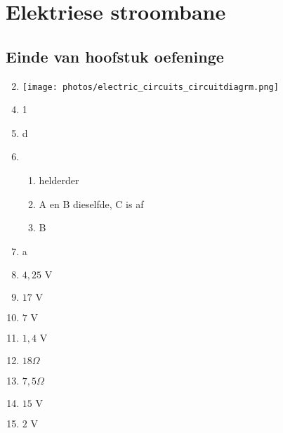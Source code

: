 \section{Elektriese stroombane}

\subsection{Einde van hoofstuk oefeninge}
\begin{enumerate}[noitemsep, label=\textbf{(\arabic*)} ]
\setcounter{enumi}{1}
 \item \texttt{[image: photos/electric\_circuits\_circuitdiagrm.png]}
\end{enumerate}
\begin{multicols}{3}
 \begin{enumerate}[noitemsep, label=\textbf{(\arabic*)} ]
\setcounter{enumi}{3}
\item 1
\item d
\item 
 \begin{enumerate}[noitemsep, label=\textbf{(\alph*)} ]
\item helderder
\item A en B dieselfde, C is af
\item B
\end{enumerate}
\item a
\item $4,25 \text{ V}$
\item $17 \text{ V}$
\item $7 \text{ V}$
\item $1,4 \text{ V}$
\item $18 \Omega$
\item $7,5 \Omega$
\item $15 \text{ V}$
\item $2 \text{ V}$
 \end{enumerate}
\end{multicols}

